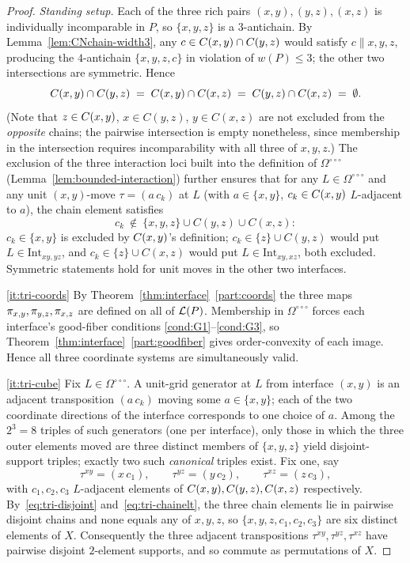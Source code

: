 \begin{proof}
\emph{Standing setup.} Each of the three rich pairs $(x,y),(y,z),(x,z)$ is
individually incomparable in $P$, so $\{x,y,z\}$ is a $3$-antichain. By
Lemma~\ref{lem:CNchain-width3}, any $c\in C(x,y)\cap C(y,z)$ would satisfy
$c\parallel x,y,z$, producing the $4$-antichain $\{x,y,z,c\}$ in violation
of $w(P)\le 3$; the other two intersections are symmetric. Hence
\begin{equation}\label{eq:tri-disjoint}
C(x,y)\cap C(y,z) \;=\; C(x,y)\cap C(x,z) \;=\; C(y,z)\cap C(x,z) \;=\; \emptyset.
\end{equation}
(Note that $z\in C(x,y)$, $x\in C(y,z)$, $y\in C(x,z)$ are not excluded from
the \emph{opposite} chains; the pairwise intersection is empty nonetheless,
since membership in the intersection requires incomparability with all
three of $x,y,z$.) The exclusion of the three interaction loci built into
the definition of $\Omega^{\circ\circ\circ}$
(Lemma~\ref{lem:bounded-interaction}) further ensures that for any
$L\in\Omega^{\circ\circ\circ}$ and any unit $(x,y)$-move $\tau=(a\,c_k)$ at
$L$ (with $a\in\{x,y\}$, $c_k\in C(x,y)$ $L$-adjacent to $a$), the chain
element satisfies
\begin{equation}\label{eq:tri-chainelt}
c_k\ \notin\ \{x,y,z\}\cup C(y,z)\cup C(x,z):
\end{equation}
$c_k\in\{x,y\}$ is excluded by $C(x,y)$'s definition; $c_k\in\{z\}\cup C(y,z)$
would put $L\in\mathrm{Int}_{xy,yz}$, and $c_k\in\{z\}\cup C(x,z)$ would put
$L\in\mathrm{Int}_{xy,xz}$, both excluded. Symmetric statements hold for
unit moves in the other two interfaces.

\ref{it:tri-coords} By Theorem~\ref{thm:interface}~\ref{part:coords}
the three maps $\pi_{x,y},\pi_{y,z},\pi_{x,z}$ are defined on all of $\mathcal{L}(P)$.
Membership in $\Omega^{\circ\circ\circ}$ forces each interface's good-fiber
conditions \ref{cond:G1}--\ref{cond:G3}, so
Theorem~\ref{thm:interface}~\ref{part:goodfiber} gives order-convexity of
each image. Hence all three coordinate systems are simultaneously valid.

\ref{it:tri-cube} Fix $L\in\Omega^{\circ\circ\circ}$. A unit-grid generator
at $L$ from interface $(x,y)$ is an adjacent transposition $(a\,c_k)$ moving
some $a\in\{x,y\}$; each of the two coordinate directions of the interface
corresponds to one choice of $a$. Among the $2^3=8$ triples of such
generators (one per interface), only those in which the three outer
elements moved are three distinct members of $\{x,y,z\}$ yield
disjoint-support triples; exactly two such \emph{canonical} triples exist.
Fix one, say
\[
\tau^{xy}=(x\,c_1),\qquad \tau^{yz}=(y\,c_2),\qquad \tau^{xz}=(z\,c_3),
\]
with $c_1,c_2,c_3$ $L$-adjacent elements of $C(x,y),C(y,z),C(x,z)$
respectively. By~\eqref{eq:tri-disjoint} and~\eqref{eq:tri-chainelt}, the
three chain elements lie in pairwise disjoint chains and none equals any
of $x,y,z$, so $\{x,y,z,c_1,c_2,c_3\}$ are six distinct elements of $X$.
Consequently the three adjacent transpositions
$\tau^{xy},\tau^{yz},\tau^{xz}$ have pairwise disjoint $2$-element
supports, and so commute as permutations of $X$.


\end{proof}
